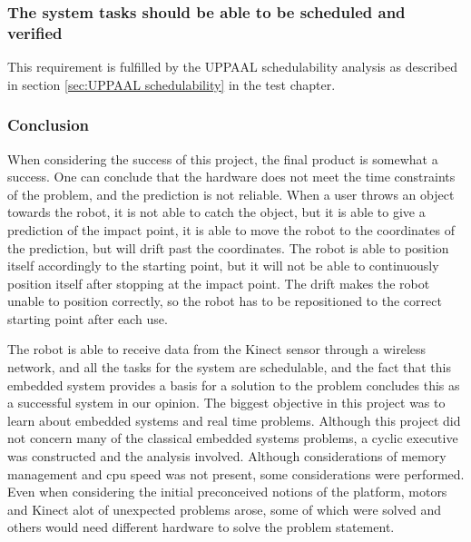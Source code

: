 \subsubsection{The system tasks should be able to be scheduled and verified}
This requirement is fulfilled by the UPPAAL schedulability analysis as described in section \ref{sec:UPPAAL schedulability} in the test chapter.


\subsubsection{Conclusion}
When considering the success of this project, the final product is somewhat a success. One can conclude that the hardware does not meet the time constraints of the problem, and the prediction is not reliable. When a user throws an object towards the robot, it is not able to catch the object, but it is able to give a prediction of the impact point, it is able to move the robot to the coordinates of the prediction, but will drift past the coordinates. The robot is able to position itself accordingly to the starting point, but it will not be able to continuously position itself after stopping at the impact point. The drift makes the robot unable to position correctly, so the robot has to be repositioned to the correct starting point after each use.\newline


The robot is able to receive data from the Kinect sensor through a wireless network, and all the tasks for the system are schedulable, and the fact that this embedded system provides a basis for a solution to the problem concludes this as a successful system in our opinion.
The biggest objective in this project was to learn about embedded systems and real time problems. Although this project did not concern many of the classical embedded systems problems, a cyclic executive was constructed and the analysis involved. Although considerations of memory management and cpu speed was not present, some considerations were performed. Even when considering the initial preconceived notions of the platform, motors and Kinect alot of unexpected problems arose, some of which were solved and others would need different hardware to solve the problem statement.  
